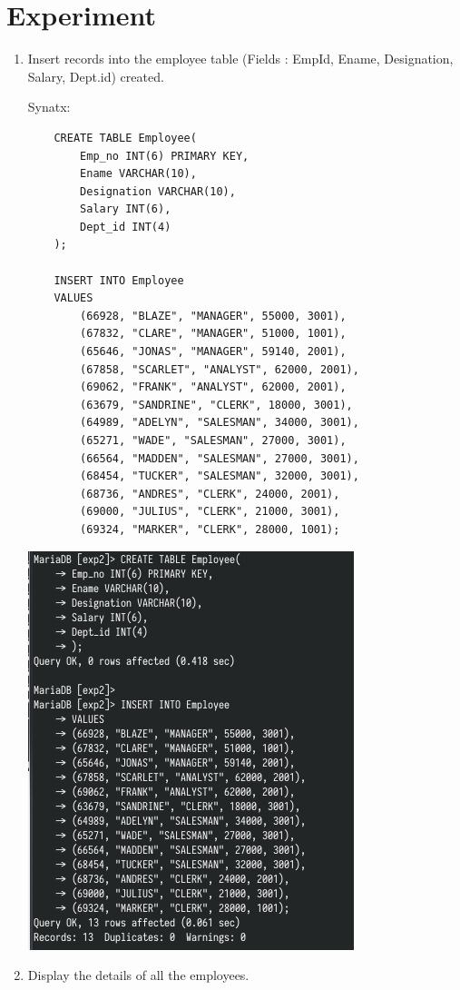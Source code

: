 \documentclass[13pt,oneside]{book}
\begin{document}
	\section*{Experiment}
		\begin{enumerate}
			\item 
				Insert records into the employee table (Fields : EmpId, Ename,
	Designation, Salary, Dept.id) created.
				
				 Synatx:
				\begin{verbatim}
	CREATE TABLE Employee(
		Emp_no INT(6) PRIMARY KEY,
		Ename VARCHAR(10),
		Designation VARCHAR(10),
		Salary INT(6),
		Dept_id INT(4)
	);
	
	INSERT INTO Employee
	VALUES
		(66928, "BLAZE", "MANAGER", 55000, 3001),
		(67832, "CLARE", "MANAGER", 51000, 1001),
		(65646, "JONAS", "MANAGER", 59140, 2001),
		(67858, "SCARLET", "ANALYST", 62000, 2001),
		(69062, "FRANK", "ANALYST", 62000, 2001),
		(63679, "SANDRINE", "CLERK", 18000, 3001),
		(64989, "ADELYN", "SALESMAN", 34000, 3001),
		(65271, "WADE", "SALESMAN", 27000, 3001),
		(66564, "MADDEN", "SALESMAN", 27000, 3001),
		(68454, "TUCKER", "SALESMAN", 32000, 3001),
		(68736, "ANDRES", "CLERK", 24000, 2001),
		(69000, "JULIUS", "CLERK", 21000, 3001),
		(69324, "MARKER", "CLERK", 28000, 1001);
				\end{verbatim}
				\includegraphics{img/p2/ss1.png}
			
				\item 
				Display the details of all the employees.
				

\end{enumerate}
\end{document}
